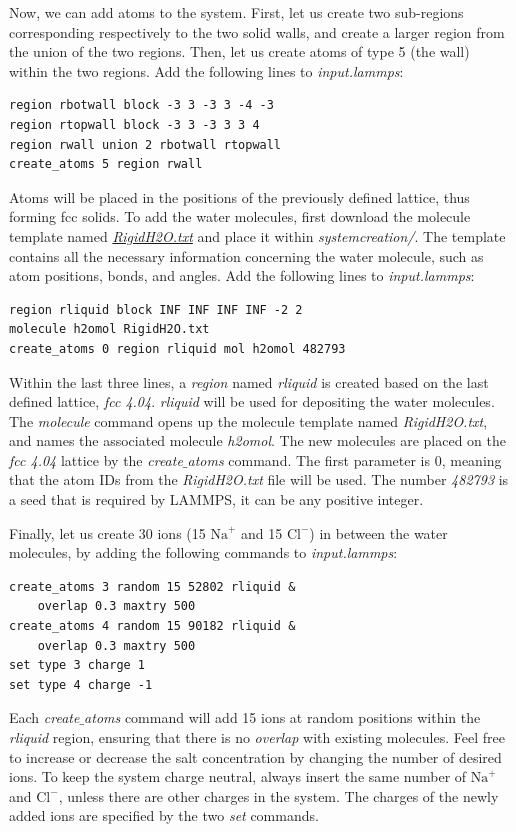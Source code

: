 \documentclass[9pt,tutorial]{livecoms}
\begin{document}
Now, we can add atoms to the system. First, let us create two sub-regions corresponding respectively to the two solid walls, and create a larger region from the union of the two regions. Then, let us create atoms of type 5 (the wall) within the two regions. Add the following lines to \textit{input.lammps}:
{\normalsize \begin{verbatim}
region rbotwall block -3 3 -3 3 -4 -3
region rtopwall block -3 3 -3 3 3 4
region rwall union 2 rbotwall rtopwall
create_atoms 5 region rwall
\end{verbatim}}
Atoms will be placed in the positions of the previously defined lattice, thus forming fcc solids. To add the water molecules, first download the molecule template named \href{https://raw.githubusercontent.com/lammpstutorials/lammpstutorials-article/main/files/tutorial4/RigidH2O.txt}{\textit{RigidH2O.txt}} and place it within \textit{systemcreation/}. The template contains all the
necessary information concerning the water molecule, such as atom positions, bonds, and angles. Add the following lines to \textit{input.lammps}:
{\normalsize \begin{verbatim}
region rliquid block INF INF INF INF -2 2
molecule h2omol RigidH2O.txt
create_atoms 0 region rliquid mol h2omol 482793
\end{verbatim}}
Within the last three lines, a \textit{region} named \textit{rliquid} is created based on the last defined lattice, \textit{fcc 4.04}. \textit{rliquid} will be used for depositing the water molecules. The \textit{molecule} command opens up the molecule template named
\textit{RigidH2O.txt}, and names the associated molecule \textit{h2omol}. The new molecules are placed on the \textit{fcc 4.04} lattice by the \textit{create$\_$atoms} command. The first parameter is 0, meaning that the atom IDs from the \textit{RigidH2O.txt} file will be used. The number \textit{482793} is a seed that is required by LAMMPS, it can be any positive integer.

Finally, let us create 30 ions (15 $\text{Na}^+$ and 15 $\text{Cl}^-$) in between the water molecules, by adding the following commands to \textit{input.lammps}:
{\normalsize \begin{verbatim}
create_atoms 3 random 15 52802 rliquid &
    overlap 0.3 maxtry 500
create_atoms 4 random 15 90182 rliquid &
    overlap 0.3 maxtry 500
set type 3 charge 1
set type 4 charge -1
\end{verbatim}}
Each \textit{create$\_$atoms} command will add 15 ions at random positions within the \textit{rliquid} region, ensuring that there is no \textit{overlap} with existing molecules. Feel free to increase or decrease the salt concentration by changing the number of desired ions. To keep the system charge neutral, always insert the same number of $\text{Na}^+$ and $\text{Cl}^-$, unless there are other charges in the system. The charges of the newly added ions are specified by the two \textit{set} commands.
\end{document}
